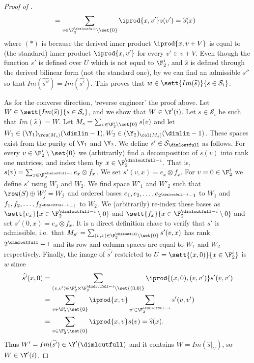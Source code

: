 \begin{proof}[Proof of ]
\begin{align*}
        &= \sum_{v \in \F_2^{\dimloutfull} \setminus \set{0}} \iprod{x,v'} s(v') = \widehat{s}(x)
    \end{align*}
    where \((*)\) is because the derived inner product \(\iprod{x,v+V}\) is equal to (the standard) inner product \(\iprod{x,v'}\) for every \(v' \in v+V\). Even though the function \(s'\) is defined over \(U\) which is not equal to \(\F_2^i\), and \(\widehat{s}\) is defined through the derived bilinear form (not the standard one), by  we can find an admissible \(s''\) so that \(Im(\widehat{s''})=Im(\widehat{s'})\). This proves that \(w \in \sett{Im(\widehat{s})}{s \in \mathcal{S}_i}\).

    As for the converse direction, `reverse engineer' the proof above. Let \(W \in \sett{Im(\widehat{s})}{s \in \mathcal{S}_i}\), and we show that \(W \in \Y'(i)\). Let \(s \in \mathcal{S}_i\) be such that \(Im(\widehat{s}) = W\). Let \(M_s = \sum_{v \in \F_2^i \setminus \set{0}}s(v)\) and let \(W_1 \in (\Y_1)_{\row(M_s)}(\dimlin - 1), W_2 \in (\Y_2)_{\col(M_s)}(\dimlin - 1)\). These spaces exist from the purity of \(\Y_1\) and \(\Y_2\). We define \(s' \in \mathcal{S}_{\dimloutfull}\) as follows. For every \(v \in \F_2^{i} \setminus \set{0}\) we (arbitrarily) find a decomposition of \(s(v)\) into rank one matrices, and index them by \(x \in \F_2^{\dimloutfull-i}\). That is, \(s(v) = \sum_{x \in \F_2^{\dimloutfull-i}} e_x \otimes f_x\). We set \(s'(v,x) = e_x \otimes f_x\). For \(v=0 \in \F_2^i\) we define \(s'\) using \(W_1\) and \(W_2\). We find space \(W'_1\) and \(W'_2\) such that \(\row(S) \oplus W'_j = W_j\) and ordered bases \(e_1,e_2,\dots,e_{2^{\dimloutfull-i}-1}\) to \(W_1\) and \(f_1,f_2,\dots,f_{2^{\dimloutfull-i}-1}\) to \(W_2\). We (arbitrarily) re-index these bases as \(\sett{e_x}{x \in \F_2^{\dimloutfull-i} \setminus 0}\) and \(\sett{f_x}{x \in \F_2^{\dimloutfull-i} \setminus 0}\) and set \(s'(0,x) = e_x \otimes f_x\). It is a direct definition chase to verify that \(s'\) is admissible, i.e.\ that \(M_{s'} = \sum_{(v,x) \in \F_2^{\dimloutfull} \setminus \set{0}} s'(v,x)\) has rank \(2^\dimloutfull -1\) and its row and column spaces are equal to \(W_1\) and \(W_2\) respectively. Finally, the image of \(\widehat{s'}\) restricted to \(U = \sett{(x,0)}{x \in \F_2^i}\) is \(w\) since
    \begin{align*}
        \widehat{s'}(x,0) &= \sum_{(v,v') \in \F_2^i \times \F_2^{\dimloutfull - i} \setminus \set{(0,0)}} \iprod{(x,0),(v,v')} s'(v,v')\\
        &= \sum_{v \in \F_2^i \setminus \set{0}} \iprod{x,v} \sum_{v' \in \F_2^{\dimloutfull - i}}s'(v,v') \\
        &= 
        \sum_{v \in \F_2^i \setminus \set{0}} \iprod{x,v} s(v) = \widehat{s}(x).
    \end{align*}
    Thus \(W' = Im(\widehat{s'}) \in \Y'(\dimloutfull)\) and it contains \(W=Im(\widehat{s}|_U)\), so \(W \in \Y'(i)\).
\end{proof}

